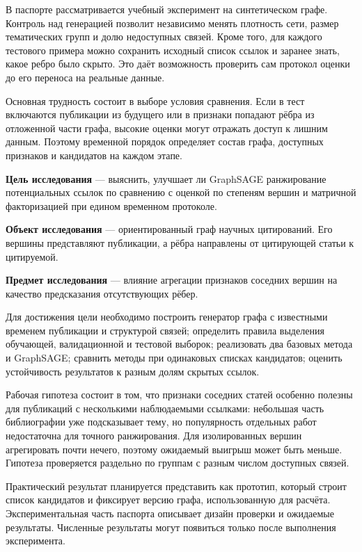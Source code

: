 \documentclass[a4paper,14pt,oneside]{extarticle}
\begin{document}
В паспорте рассматривается учебный эксперимент на синтетическом графе. Контроль над генерацией
позволит независимо менять плотность сети, размер тематических групп и долю недоступных связей.
Кроме того, для каждого тестового примера можно сохранить исходный список ссылок и заранее знать,
какое ребро было скрыто. Это даёт возможность проверить сам протокол оценки до его переноса
на реальные данные.

Основная трудность состоит в выборе условия сравнения. Если в тест включаются публикации
из будущего или в признаки попадают рёбра из отложенной части графа, высокие оценки могут отражать
доступ к лишним данным. Поэтому временной порядок определяет состав графа, доступных признаков
и кандидатов на каждом этапе.

\clearpage
\textbf{Цель исследования} — выяснить, улучшает ли GraphSAGE ранжирование потенциальных ссылок
по сравнению с оценкой по степеням вершин и матричной факторизацией при едином временном протоколе.

\textbf{Объект исследования} — ориентированный граф научных цитирований. Его вершины представляют
публикации, а рёбра направлены от цитирующей статьи к цитируемой.

\textbf{Предмет исследования} — влияние агрегации признаков соседних вершин на качество
предсказания отсутствующих рёбер.

Для достижения цели необходимо построить генератор графа с известными временем публикации
и структурой связей; определить правила выделения обучающей, валидационной и тестовой выборок;
реализовать два базовых метода и GraphSAGE; сравнить методы при одинаковых списках кандидатов;
оценить устойчивость результатов к разным долям скрытых ссылок.

Рабочая гипотеза состоит в том, что признаки соседних статей особенно полезны для публикаций
с несколькими наблюдаемыми ссылками: небольшая часть библиографии уже подсказывает тему,
но популярность отдельных работ недостаточна для точного ранжирования. Для изолированных
вершин агрегировать почти нечего, поэтому ожидаемый выигрыш может быть меньше. Гипотеза
проверяется раздельно по группам с разным числом доступных связей.

Практический результат планируется представить как прототип, который строит список кандидатов
и фиксирует версию графа, использованную для расчёта. Экспериментальная часть паспорта описывает
дизайн проверки и ожидаемые результаты. Численные результаты могут появиться только после
выполнения эксперимента.
\end{document}
